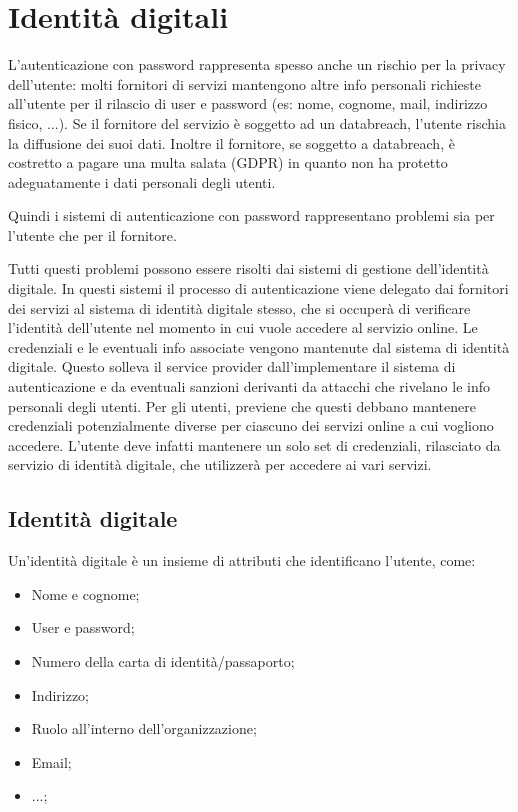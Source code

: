 \chapter{Identità digitali}
L'autenticazione con password rappresenta spesso anche un rischio per la privacy dell'utente: molti fornitori di servizi mantengono altre info personali richieste all'utente per il rilascio di user e password (es: nome, cognome, mail, indirizzo fisico, ...). Se il fornitore del servizio è soggetto ad un databreach, l'utente rischia la diffusione dei suoi dati. Inoltre il fornitore, se soggetto a databreach, è costretto a pagare una multa salata (GDPR) in quanto non ha protetto adeguatamente i dati personali degli utenti.

Quindi i sistemi di autenticazione con password rappresentano problemi sia per l'utente che per il fornitore. 

Tutti questi problemi possono essere risolti dai sistemi di gestione dell'identità digitale. In questi sistemi il processo di autenticazione viene delegato dai fornitori dei servizi al sistema di identità digitale stesso, che si occuperà di verificare l'identità dell'utente nel momento in cui vuole accedere al servizio online. Le credenziali e le eventuali info associate vengono mantenute dal sistema di identità digitale. 
Questo solleva il service provider dall'implementare il sistema di autenticazione e da eventuali sanzioni derivanti da attacchi che rivelano le info personali degli utenti. 
Per gli utenti, previene che questi debbano mantenere credenziali potenzialmente diverse per ciascuno dei servizi online a cui vogliono accedere. L'utente deve infatti mantenere un solo set di credenziali, rilasciato da servizio di identità digitale, che utilizzerà per accedere ai vari servizi. 

\section{Identità digitale}
Un'identità digitale è un insieme di attributi che identificano l'utente, come:
\begin{itemize}
    \item Nome e cognome;
    \item User e password;
    \item Numero della carta di identità/passaporto;
    \item Indirizzo;
    \item Ruolo all'interno dell'organizzazione;
    \item Email;
    \item ...;
\end{itemize}

